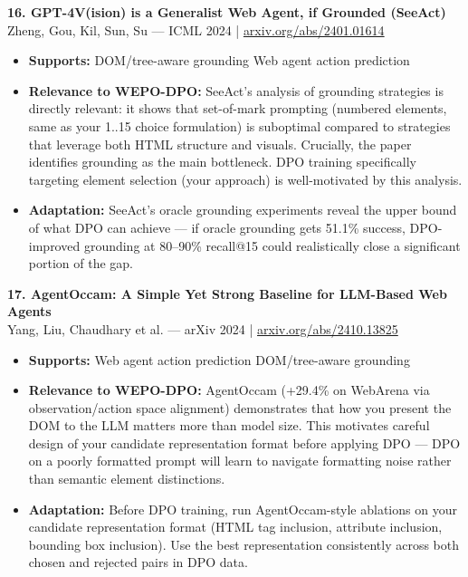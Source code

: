 \documentclass[pdflatex,sn-mathphys-num]{sn-jnl}
\theoremstyle{thmstyleone}
\theoremstyle{thmstyletwo}
\theoremstyle{thmstylethree}
\begin{document}
\textbf{16. GPT-4V(ision) is a Generalist Web Agent, if Grounded (SeeAct)} \\
Zheng, Gou, Kil, Sun, Su --- ICML 2024 | \href{https://arxiv.org/abs/2401.01614}{arxiv.org/abs/2401.01614}

\begin{itemize}
    \item \textbf{Supports:} \checkmark DOM/tree-aware grounding \checkmark Web agent action prediction
    \item \textbf{Relevance to WEPO-DPO:} SeeAct's analysis of grounding strategies is directly relevant: it shows that set-of-mark prompting (numbered elements, same as your 1..15 choice formulation) is suboptimal compared to strategies that leverage both HTML structure and visuals. Crucially, the paper identifies grounding as the main bottleneck. DPO training specifically targeting element selection (your approach) is well-motivated by this analysis.
    \item \textbf{Adaptation:} SeeAct's oracle grounding experiments reveal the upper bound of what DPO can achieve --- if oracle grounding gets 51.1\% success, DPO-improved grounding at 80--90\% recall@15 could realistically close a significant portion of the gap.
\end{itemize}

\textbf{17. AgentOccam: A Simple Yet Strong Baseline for LLM-Based Web Agents} \\
Yang, Liu, Chaudhary et al. --- arXiv 2024 | \href{https://arxiv.org/abs/2410.13825}{arxiv.org/abs/2410.13825}

\begin{itemize}
    \item \textbf{Supports:} \checkmark Web agent action prediction \checkmark DOM/tree-aware grounding
    \item \textbf{Relevance to WEPO-DPO:} AgentOccam (+29.4\% on WebArena via observation/action space alignment) demonstrates that how you present the DOM to the LLM matters more than model size. This motivates careful design of your candidate representation format before applying DPO --- DPO on a poorly formatted prompt will learn to navigate formatting noise rather than semantic element distinctions.
    \item \textbf{Adaptation:} Before DPO training, run AgentOccam-style ablations on your candidate representation format (HTML tag inclusion, attribute inclusion, bounding box inclusion). Use the best representation consistently across both chosen and rejected pairs in DPO data.
\end{itemize}
\end{document}
